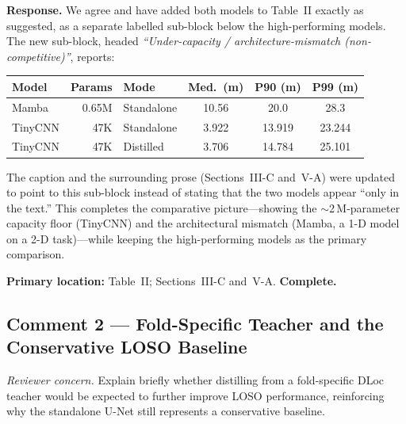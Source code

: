 \documentclass[11pt]{article}
\newcommand{\status}[1]{\textbf{\color{okgreen}#1}}
\newcommand{\concern}[1]{\textit{Reviewer concern.} #1}
\newcommand{\response}[1]{\textbf{Response.} #1}
\begin{document}
\response{We agree and have added both models to Table~II exactly as suggested, as a separate labelled sub-block below the high-performing models.} The new sub-block, headed \emph{``Under-capacity / architecture-mismatch (non-competitive)''}, reports:
\begin{center}
\small
\begin{tabular}{@{}l r l c c c@{}}
\toprule
\textbf{Model} & \textbf{Params} & \textbf{Mode} & \textbf{Med.\ (m)} & \textbf{P90 (m)} & \textbf{P99 (m)} \\
\midrule
Mamba   & 0.65M & Standalone & 10.56 & 20.0   & 28.3 \\
TinyCNN & 47K   & Standalone & 3.922 & 13.919 & 23.244 \\
TinyCNN & 47K   & Distilled  & 3.706 & 14.784 & 25.101 \\
\bottomrule
\end{tabular}
\end{center}
The caption and the surrounding prose (Sections~III-C and~V-A) were updated to point to this sub-block instead of stating that the two models appear ``only in the text.'' This completes the comparative picture---showing the $\sim$2\,M-parameter capacity floor (TinyCNN) and the architectural mismatch (Mamba, a 1-D model on a 2-D task)---while keeping the high-performing models as the primary comparison.

\textbf{Primary location:} Table~II; Sections~III-C and~V-A. \hfill \status{Complete.}

\subsection{Comment 2 --- Fold-Specific Teacher and the Conservative LOSO Baseline}
\concern{Explain briefly whether distilling from a fold-specific DLoc teacher would be expected to further improve LOSO performance, reinforcing why the standalone U-Net still represents a conservative baseline.}
\end{document}
